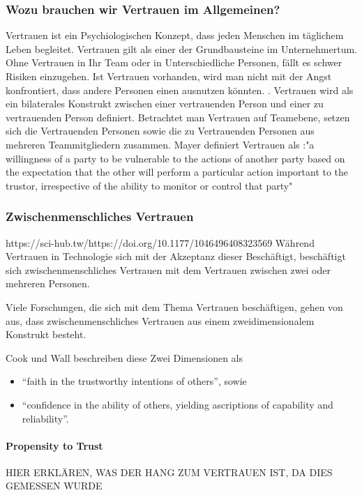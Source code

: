 \documentclass[a4paper,11pt]{article}%
\renewcommand{\\}{\vspace*{0.5\baselineskip} \newline}
\begin{document}
		\subsubsection{Wozu brauchen wir Vertrauen im Allgemeinen?}
		Vertrauen ist ein Psychiologischen Konzept, dass jeden Menschen im täglichem Leben begleitet.
Vertrauen gilt als einer der Grundbausteine im Unternehmertum. Ohne Vertrauen in Ihr Team oder in Unterschiedliche Personen, fällt es schwer Risiken einzugehen. Ist Vertrauen vorhanden, wird man nicht mit der Angst konfrontiert, dass andere Personen einen ausnutzen könnten. \citep[p.1152]{breuer2016does}.
Vertrauen wird als ein bilaterales Konstrukt zwischen einer vertrauenden Person und einer zu vertrauenden Person definiert.
\citep[p.728-729]{mayer1995integrative}
Betrachtet man Vertrauen auf Teamebene, setzen sich die Vertrauenden Personen sowie die zu Vertrauenden Personen aus mehreren Teammitgliedern zusammen.
 Mayer definiert Vertrauen als :"a willingness of a party to be vulnerable to the actions of another party based on the expectation that the other will perform a particular action important to the trustor, irrespective of the ability to monitor or control that party" \citep[p.712]{mayer1995integrative} \\

		\subsubsection{Zwischenmenschliches Vertrauen}
		https://sci-hub.tw/https://doi.org/10.1177/1046496408323569
Während Vertrauen in Technologie sich mit der Akzeptanz dieser Beschäftigt, beschäftigt sich zwischenmenschliches Vertrauen mit dem Vertrauen zwischen zwei oder mehreren Personen. \citep{mcknight2011trust}

Viele Forschungen, die sich mit dem Thema Vertrauen beschäftigen, gehen von aus, dass zwischenmenschliches Vertrauen aus einem zweidimensionalem Konstrukt besteht. \citep{johnson2005cognitive} \citep{cook1980new}

Cook und Wall beschreiben diese Zwei Dimensionen als  \begin{itemize}
\item{ “faith in the trustworthy intentions of others”, sowie}
\item{“confidence in the ability of others, yielding ascriptions of capability and reliability”.}
\end{itemize}

\paragraph{Propensity to Trust}
HIER ERKLÄREN, WAS DER HANG ZUM VERTRAUEN IST, DA DIES GEMESSEN WURDE
\end{document}
